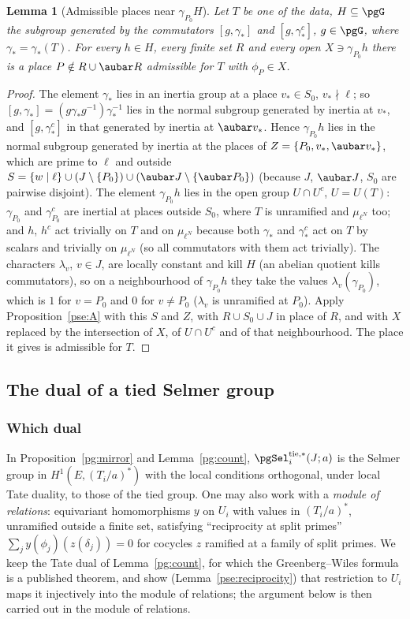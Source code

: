 \documentclass[10pt]{amsart}
\newtheorem{lemma}[theorem]{Lemma}
\theoremstyle{definition}
\theoremstyle{remark}
\begin{document}
\begin{lemma}[Admissible places near $\gamma_{P_0}H$]\label{pse:near}
Let $T$ be one of the data, $H\subseteq\pgG$ the subgroup generated by the commutators
$[g,\gamma_*]$ and $[g,\gamma_*^c]$, $g\in\pgG$, where $\gamma_*=\gamma_*(T)$. For every $h\in H$,
every finite set $R$ and every open $X\ni\gamma_{P_0}h$ there is a place $P\notin R\cup\aubar R$
admissible for $T$ with $\phi_P\in X$.
\end{lemma}
\begin{proof}
The element $\gamma_*$ lies in an inertia group at a place $v_*\in S_0$, $v_*\nmid\ell$; so
$[g,\gamma_*]=(g\gamma_*g^{-1})\gamma_*^{-1}$ lies in the normal subgroup generated by inertia at
$v_*$, and $[g,\gamma_*^c]$ in that generated by inertia at $\aubar v_*$. Hence $\gamma_{P_0}h$ lies
in the normal subgroup generated by inertia at the places of $Z=\{P_0,v_*,\aubar v_*\}$, which are
prime to $\ell$ and outside $S=\{w\mid\ell\}\cup(J\setminus\{P_0\})\cup(\aubar J\setminus\{\aubar
P_0\})$ (because $J$, $\aubar J$, $S_0$ are pairwise disjoint). The element $\gamma_{P_0}h$ lies in
the open group $U\cap U^c$, $U=U(T)$: $\gamma_{P_0}$ and $\gamma_{P_0}^c$ are inertial at places
outside $S_0$, where $T$ is unramified and $\mu_{\ell^N}$ too; and $h$, $h^c$ act trivially on $T$
and on $\mu_{\ell^N}$ because both $\gamma_*$ and $\gamma_*^{c}$ act on $T$ by scalars and trivially on
$\mu_{\ell^N}$ (so all commutators with them act trivially). The characters $\lambda_v$, $v\in J$, are
locally constant and kill $H$ (an abelian quotient kills commutators), so on a neighbourhood of
$\gamma_{P_0}h$ they take the values $\lambda_v(\gamma_{P_0})$, which is $1$ for $v=P_0$ and $0$ for
$v\ne P_0$ ($\lambda_v$ is unramified at $P_0$). Apply Proposition~\ref{pse:A} with this $S$ and
$Z$, with $R\cup S_0\cup J$ in place of $R$, and with $X$ replaced by the intersection of $X$, of
$U\cap U^c$ and of that neighbourhood. The place it gives is admissible for $T$.
\end{proof}

\subsection{The dual of a tied Selmer group}\label{pse:ss-mirror}

\subsubsection*{Which dual}
In Proposition~\ref{pg:mirror} and Lemma~\ref{pg:count}, $\pgSel^{\mathrm{tie},*}_i(J;a)$ is the
Selmer group in $H^1(E,(T_i/a)^*)$ with the local conditions orthogonal, under local Tate duality,
to those of the tied group. One may also work with a \emph{module of relations}: equivariant
homomorphisms $y$ on $U_i$ with values in $(T_i/a)^*$, unramified outside a finite set, satisfying
``reciprocity at split primes'' $\sum_jy(\phi_j)(z(\delta_j))=0$ for cocycles $z$ ramified at a
family of split primes. We keep the Tate dual of Lemma~\ref{pg:count}, for which the
Greenberg--Wiles formula is a published theorem, and show (Lemma~\ref{pse:reciprocity}) that
restriction to $U_i$ maps it injectively into the module of relations; the argument below is then
carried out in the module of relations.
\end{document}
